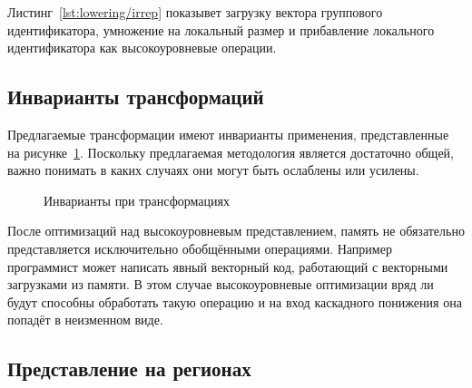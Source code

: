 Листинг~\cref{lst:lowering/irrep} показывет загрузку вектора группового идентификатора, умножение на локальный размер и прибавление локального идентификатора как высокоуровневые операции.

\subsection{Инварианты трансформаций}\label{subsec:lowering/passes/invariants}

Предлагаемые трансформации имеют инварианты применения, представленные на рисунке~\cref{fig:highlevel-mgr-inv}. Поскольку предлагаемая методология является достаточно общей, важно понимать в каких случаях они могут быть ослаблены или усилены.

\begin{figure}[ht]
    \caption{Инварианты при трансформациях}\label{fig:highlevel-mgr-inv}
\end{figure}

После оптимизаций над высокоуровневым представлением, память не обязательно представляется исключительно обобщёнными операциями. Например программист может написать явный векторный код, работающий с векторными загрузками из памяти. В этом случае высокоуровневые оптимизации вряд ли будут способны обработать такую операцию и на вход каскадного понижения она попадёт в неизменном виде.

\subsection{Представление на регионах}\label{subsec:lowering/passes/lowlevel}

